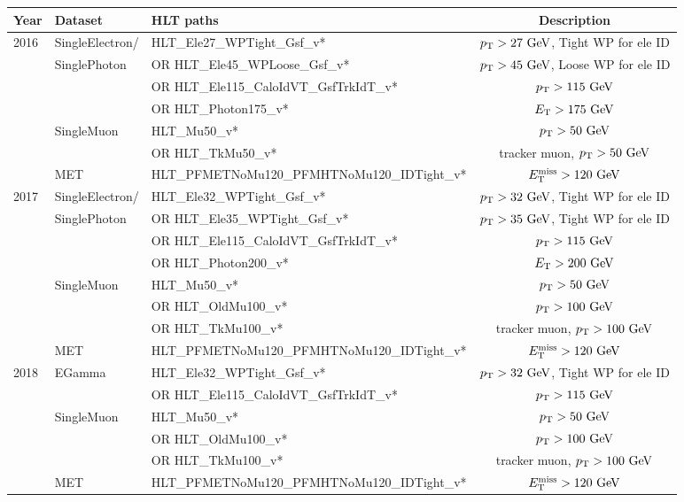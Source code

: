 \scriptsize
\begin{tabular}{l|l|l|c}
  \hline
  Year & Dataset & HLT paths & Description\\
  \hline
  \hline
  2016 & \ttfamily SingleElectron/ & \ttfamily HLT\_Ele27\_WPTight\_Gsf\_v* & $\pt>27\unit{GeV}$, Tight WP for ele ID \\
  & \ttfamily SinglePhoton & \ttfamily OR HLT\_Ele45\_WPLoose\_Gsf\_v* & $\pt>45\unit{GeV}$, Loose WP for ele ID \\
  && \ttfamily OR HLT\_Ele115\_CaloIdVT\_GsfTrkIdT\_v* & $\pt>115\unit{GeV}$ \\
  && \ttfamily OR HLT\_Photon175\_v* & $\Et>175\unit{GeV}$ \\
  \cline{2-4}
  & \ttfamily SingleMuon & \ttfamily HLT\_Mu50\_v* & $\pt>50\unit{GeV}$ \\
  && \ttfamily OR HLT\_TkMu50\_v* & tracker muon, $\pt>50\unit{GeV}$ \\
  \cline{2-4}
  & \ttfamily MET & \ttfamily HLT\_PFMETNoMu120\_PFMHTNoMu120\_IDTight\_v* & $\Etmiss>120\unit{GeV}$ \\
  \hline
  2017 & \ttfamily SingleElectron/& \ttfamily HLT\_Ele32\_WPTight\_Gsf\_v* & $\pt>32\unit{GeV}$, Tight WP for ele ID \\
  & \ttfamily SinglePhoton & \ttfamily OR HLT\_Ele35\_WPTight\_Gsf\_v* & $\pt>35\unit{GeV}$, Tight WP for ele ID \\
  && \ttfamily OR HLT\_Ele115\_CaloIdVT\_GsfTrkIdT\_v* & $\pt>115\unit{GeV}$ \\
  && \ttfamily OR HLT\_Photon200\_v* & $\Et>200\unit{GeV}$ \\
  \cline{2-4}
  & \ttfamily SingleMuon & \ttfamily HLT\_Mu50\_v* & $\pt>50\unit{GeV}$ \\
  && \ttfamily OR HLT\_OldMu100\_v* & $\pt>100\unit{GeV}$ \\
  && \ttfamily OR HLT\_TkMu100\_v* & tracker muon, $\pt>100\unit{GeV}$ \\
  \cline{2-4}
  & \ttfamily MET & \ttfamily HLT\_PFMETNoMu120\_PFMHTNoMu120\_IDTight\_v* & $\Etmiss>120\unit{GeV}$ \\
  \hline
  2018 & \ttfamily EGamma & \ttfamily HLT\_Ele32\_WPTight\_Gsf\_v* & $\pt>32\unit{GeV}$, Tight WP for ele ID \\
  && \ttfamily OR HLT\_Ele115\_CaloIdVT\_GsfTrkIdT\_v* & $\pt>115\unit{GeV}$ \\
  \cline{2-4}
  & \ttfamily SingleMuon & \ttfamily HLT\_Mu50\_v* & $\pt>50\unit{GeV}$ \\
  && \ttfamily OR HLT\_OldMu100\_v* & $\pt>100\unit{GeV}$ \\
  && \ttfamily OR HLT\_TkMu100\_v* & tracker muon, $\pt>100\unit{GeV}$ \\
  \cline{2-4}
  & \ttfamily MET & \ttfamily HLT\_PFMETNoMu120\_PFMHTNoMu120\_IDTight\_v* & $\Etmiss>120\unit{GeV}$ \\
  \hline
\end{tabular}

